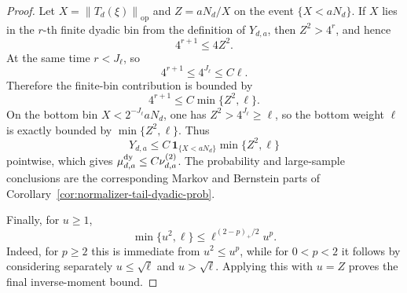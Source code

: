 \documentclass[11pt]{amsart}
\numberwithin{equation}{section}
\theoremstyle{definition}
\theoremstyle{remark}
\newcommand{\op}{\mathrm{op}}
\newcommand{\norm}[1]{\left\lVert #1\right\rVert}
\begin{document}
\begin{proof}
Let \(X=\norm{T_d(\xi)}_{\op}\) and \(Z=aN_d/X\) on the event
\(\{X<aN_d\}\).  If \(X\) lies in the \(r\)-th finite dyadic bin from the
definition of \(Y_{d,a}\), then \(Z^2>4^r\), and hence
\[
  4^{r+1}\le4Z^2.
\]
At the same time \(r<J_\ell\), so
\[
  4^{r+1}\le 4^{J_\ell}\le C\ell .
\]
Therefore the finite-bin contribution is bounded by
\[
  4^{r+1}\le C\min\{Z^2,\ell\}.
\]
On the bottom bin \(X<2^{-J_\ell}aN_d\), one has
\(Z^2>4^{J_\ell}\ge\ell\), so the bottom weight \(\ell\) is exactly bounded by
\(\min\{Z^2,\ell\}\).  Thus
\[
  Y_{d,a}\le
  C\,\mathbf 1_{\{X<aN_d\}}\min\{Z^2,\ell\}
\]
pointwise, which gives
\(\mu_{d,a}^{\rm dy}\le C\nu_{d,a}^{(2)}\).  The probability and
large-sample conclusions are the corresponding Markov and Bernstein parts of
Corollary~\ref{cor:normalizer-tail-dyadic-prob}.

Finally, for \(u\ge1\),
\[
  \min\{u^2,\ell\}\le \ell^{(2-p)_+/2}u^p .
\]
Indeed, for \(p\ge2\) this is immediate from \(u^2\le u^p\), while for
\(0<p<2\) it follows by considering separately \(u\le\sqrt\ell\) and
\(u>\sqrt\ell\).  Applying this with \(u=Z\) proves the final inverse-moment
bound.
\end{proof}
\end{document}
